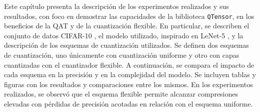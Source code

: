 \noindent Este capítulo presenta la descripción de los experimentos realizados y sus resultados, con foco en demostrar las capacidades de la biblioteca \texttt{QTensor}, en los beneficios de la QAT y de la cuantización flexible. En particular, se describen el conjunto de datos CIFAR-10 \cite{krizhevsky2009learning}, el modelo utilizado, inspirado en LeNet-5 \cite{lecun1998gradient}, y la descripción de los esquemas de cuantización utilizados. Se definen dos esquemas de cuantización, uno únicamente con cuantización uniforme y otro con capas cuantizadas con el cuantizador flexible. A continuación, se compara el impacto de cada esquema en la precisión y en la complejidad del modelo. Se incluyen tablas y figuras con los resultados y comparaciones entre los mismos. En los experimentos realizados, se observó que el esquema flexible permite alcanzar compresiones elevadas con pérdidas de precisión acotadas en relación con el esquema uniforme.


